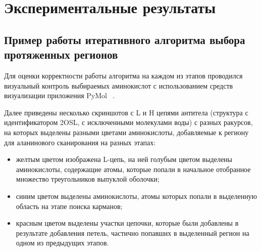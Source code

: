 \graphicspath{{../images/algorithm/}}
\chapter{Экспериментальные результаты}
\section{Пример работы итеративного алгоритма выбора протяженных регионов}
Для оценки корректности работы алгоритма на каждом из этапов проводился визуальный контроль выбираемых аминокислот с использованием средств визуализации приложения PyMol ~\cite{pymol}.

Далее приведены несколько скриншотов с L и H цепями антитела (структура с идентификатором 2OSL, с исключенными молекулами воды) с разных ракурсов, на которых выделены разными цветами аминокислоты, добавляемые к региону для аланинового сканирования на разных этапах:
\begin{itemize}

\item желтым цветом изображена L-цепь, на ней голубым цветом выделены аминокислоты, содержащие атомы, которые попали в начальное отобранное множество треугольников выпуклой оболочки;

\item синим цветом выделены аминокислоты, атомы которых попали в выделенную область на этапе поиска карманов;

\item красным цветом выделены участки цепочки, которые были добавлены в результате добавления петель, частично попавших в выделенный регион на одном из предыдущих этапов.
\end{itemize}




